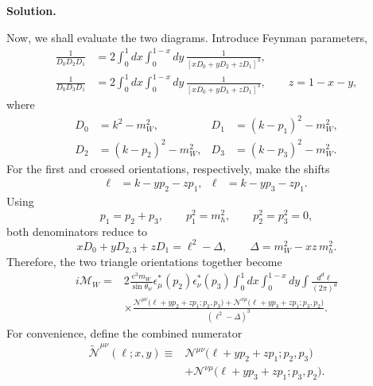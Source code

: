 \documentclass[a4paper,11pt]{article}
\newenvironment{solution}{\par\medskip\noindent\textbf{Solution.}\par\smallskip}{\par\medskip}
\begin{document}
\begin{solution}
Now, we shall evaluate the two diagrams.
Introduce Feynman parameters,
\begin{equation}
\begin{aligned}
\frac{1}{D_0D_2D_1}
&=
2\int_0^1dx\int_0^{1-x}dy\,
\frac{1}{[xD_0+yD_2+zD_1]^3},
\\
\frac{1}{D_0D_3D_1}
&=
2\int_0^1dx\int_0^{1-x}dy\,
\frac{1}{[xD_0+yD_3+zD_1]^3},
\qquad
z=1-x-y,
\end{aligned}
\end{equation}
where
\begin{equation}
\begin{aligned}
D_0&=k^2-m_W^2,
&
D_1&=(k-p_1)^2-m_W^2,
\\
D_2&=(k-p_2)^2-m_W^2,
&
D_3&=(k-p_3)^2-m_W^2.
\end{aligned}
\end{equation}
For the first and crossed orientations, respectively, make the shifts
\begin{equation}
\begin{aligned}
    \ell&=k-yp_2-zp_1,
&
    \ell&=k-yp_3-zp_1.
\end{aligned}
\end{equation}
Using
\begin{equation}
    p_1=p_2+p_3,
    \qquad
    p_1^2=m_h^2,
    \qquad
    p_2^2=p_3^2=0,
\end{equation}
both denominators reduce to
\begin{equation}
    xD_0+yD_{2,3}+zD_1
    =
    \ell^2-\Delta,
    \qquad
    \Delta=m_W^2-xz\,m_h^2.
\end{equation}
Therefore, the two triangle orientations together become
\begin{equation}
\begin{aligned}
i\mathcal M_{W}
={}&
2\frac{e^3m_W}{\sin\theta_w}
\epsilon_\mu^*(p_2)\epsilon_\nu^*(p_3)
\int_0^1dx\int_0^{1-x}dy
\int\frac{d^d\ell}{(2\pi)^d}
\\
&\times
\frac{
\mathcal N^{\mu\nu}
\bigl(\ell+yp_2+zp_1;p_2,p_3\bigr)
+
\mathcal N^{\nu\mu}
\bigl(\ell+yp_3+zp_1;p_3,p_2\bigr)
}{
(\ell^2-\Delta)^3
}.
\end{aligned}
\end{equation}
For convenience, define the combined numerator
\begin{equation}
\begin{aligned}
\widetilde{\mathcal N}^{\mu\nu}(\ell;x,y)
\equiv{}&
\mathcal N^{\mu\nu}
\bigl(\ell+yp_2+zp_1;p_2,p_3\bigr)
\\
&+
\mathcal N^{\nu\mu}
\bigl(\ell+yp_3+zp_1;p_3,p_2\bigr).

\end{aligned}
\end{equation}
\end{solution}
\end{document}
